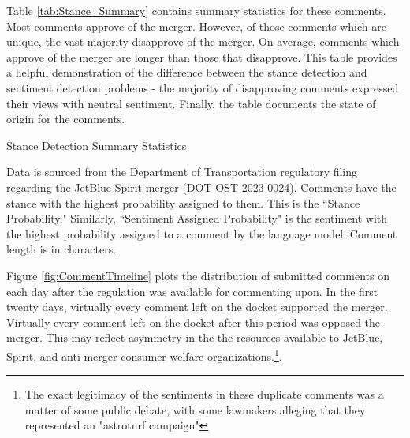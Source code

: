 \documentclass{article}
\begin{document}
\begin{appendices}
Table \ref{tab:Stance_Summary} contains summary statistics for these comments. Most comments approve of the merger. However, of those comments which are unique, the vast majority disapprove of the merger. On average, comments which approve of the merger are longer than those that disapprove. This table provides a helpful demonstration of the difference between the stance detection and sentiment detection problems -  the majority of disapproving comments expressed their views with neutral sentiment. Finally, the table documents the state of origin for the comments. 

\begin{table}[h]
    \caption{Stance Detection Summary Statistics}
    \label{tab:Stance_Summary}
    
    \begin{minipage}{\textwidth} 
        {\footnotesize Data is sourced from the Department of Transportation regulatory filing regarding the JetBlue-Spirit merger  (DOT-OST-2023-0024). Comments have the stance with the highest probability assigned to them. This is the ``Stance Probability." Similarly, ``Sentiment Assigned Probability" is the sentiment with the highest  probability assigned to a comment by the language model. Comment length is in characters.} 
    \end{minipage}
\end{table}

Figure \ref{fig:CommentTimeline} plots the distribution of submitted comments on each day after the regulation was available for commenting upon. In the first twenty days, virtually every comment left on the docket supported the merger. Virtually every comment left on the docket after this period was opposed the merger. This may reflect asymmetry in the the resources available to JetBlue, Spirit, and anti-merger consumer welfare organizations.\footnote{The exact legitimacy of the sentiments in these duplicate comments was a matter of some public debate, with some lawmakers alleging that they represented an "astroturf campaign"\citep{birnbaum_elizabeth_2023}}.  


\end{appendices}
\end{document}
